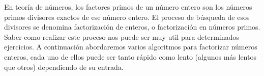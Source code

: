 En teoría de números, los factores primos de un número entero son los números primos divisores exactos de ese número entero. El proceso de búsqueda de esos divisores se denomina
factorización de enteros, o factorización en números primos. Saber como realizar este proceso nos
puede ser muy util para determinados ejercicios. A continuación abordaremos varios algoritmos para factorizar números enteros, cada uno de ellos puede ser tanto rápido como lento (algunos más lentos
que otros) dependiendo de su entrada.